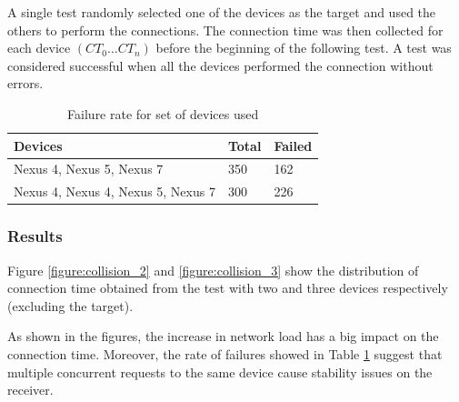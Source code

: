 A single test randomly selected one of the devices as the target and used the others to perform the connections.
The connection time was then collected for each device $(CT_0 \dots CT_n)$ before the beginning of the following test. 
A test was considered successful when all the devices performed the connection without errors.


\begin{table}[h]
\centering
\caption{Failure rate for set of devices used}
\label{table:collision-failure-rate}
\begin{tabular}{lll}
\hline
Devices                             & Total     & Failed    \\ \hline
Nexus 4, Nexus 5, Nexus 7           & 350       & 162       \\
Nexus 4, Nexus 4, Nexus 5, Nexus 7  & 300       & 226       \\
\hline
\end{tabular}
\end{table}

\subsubsection{Results}
Figure \ref{figure:collision_2} and \ref{figure:collision_3} show the distribution of connection time obtained from the test with two and three devices respectively (excluding the target).

As shown in the figures, the increase in network load has a big impact on the connection time.
Moreover, the rate of failures showed in Table \ref{table:collision-failure-rate} suggest that multiple concurrent requests to the same device cause stability issues on the receiver.
